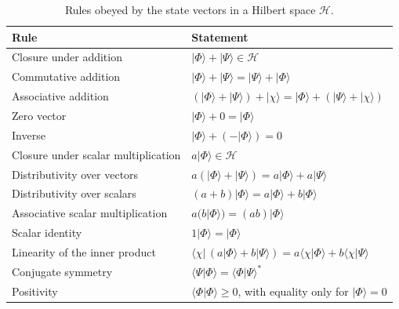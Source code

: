 \documentclass[11pt]{article}      %
\numberwithin{equation}{section}   %
\begin{document}
\begin{table}[h]
    \centering
    \caption{Rules obeyed by the state vectors in a Hilbert space $\mathcal{H}$.}
    \label{tab:axioms}
    \renewcommand{\arraystretch}{1.3}
    \begin{tabular}{ll}
        \toprule
        Rule & Statement \\
        \midrule
        Closure under addition & $|\Phi\rangle + |\Psi\rangle \in \mathcal{H}$ \\
        Commutative addition & $|\Phi\rangle + |\Psi\rangle = |\Psi\rangle + |\Phi\rangle$ \\
        Associative addition & $(|\Phi\rangle + |\Psi\rangle) + |\chi\rangle = |\Phi\rangle + (|\Psi\rangle + |\chi\rangle)$ \\
        Zero vector & $|\Phi\rangle + 0 = |\Phi\rangle$ \\
        Inverse & $|\Phi\rangle + (-|\Phi\rangle) = 0$ \\
        Closure under scalar multiplication & $a|\Phi\rangle \in \mathcal{H}$ \\
        Distributivity over vectors & $a(|\Phi\rangle + |\Psi\rangle) = a|\Phi\rangle + a|\Psi\rangle$ \\
        Distributivity over scalars & $(a+b)|\Phi\rangle = a|\Phi\rangle + b|\Phi\rangle$ \\
        Associative scalar multiplication & $a(b|\Phi\rangle) = (ab)|\Phi\rangle$ \\
        Scalar identity & $1|\Phi\rangle = |\Phi\rangle$ \\
        \midrule
        Linearity of the inner product & $\langle\chi|\,(a|\Phi\rangle + b|\Psi\rangle) = a\langle\chi|\Phi\rangle + b\langle\chi|\Psi\rangle$ \\
        Conjugate symmetry & $\langle\Psi|\Phi\rangle = \langle\Phi|\Psi\rangle^*$ \\
        Positivity & $\langle\Phi|\Phi\rangle \geq 0$, with equality only for $|\Phi\rangle = 0$ \\
        \bottomrule
    \end{tabular}
\end{table}
\end{document}
